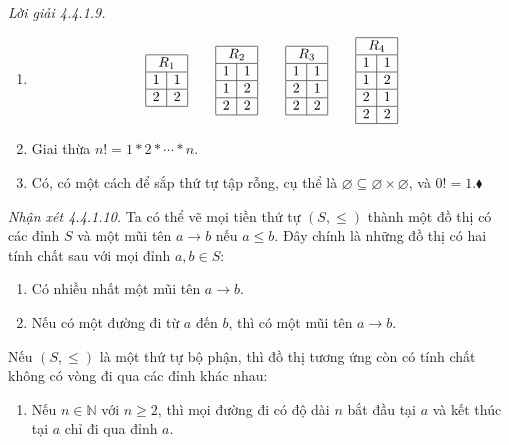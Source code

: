 \noindent\textit{Lời giải 4.4.1.9.}\keepwithnext
\begin{enumerate}[label=\alph*.]
\item
\[
\begin{array}{|r|r|}\hline\multicolumn{2}{|c|}{R_1}\\\hline1&1\\\hline2&2\\\hline\end{array}\qquad
\begin{array}{|r|r|}\hline\multicolumn{2}{|c|}{R_2}\\\hline1&1\\\hline1&2\\\hline2&2\\\hline\end{array}\qquad
\begin{array}{|r|r|}\hline\multicolumn{2}{|c|}{R_3}\\\hline1&1\\\hline2&1\\\hline2&2\\\hline\end{array}\qquad
\begin{array}{|r|r|}\hline\multicolumn{2}{|c|}{R_4}\\\hline1&1\\\hline1&2\\\hline2&1\\\hline2&2\\\hline\end{array}
\]
\item Giai thừa $n!=1*2*\cdots*n$.
\item Có, có một cách để sắp thứ tự tập rỗng, cụ thể là $\varnothing\subseteq\varnothing\times\varnothing$, và $0!=1$.\nobreak\hfill$\blacklozenge$
\end{enumerate}

\noindent\textit{Nhận xét 4.4.1.10.} Ta có thể vẽ mọi tiền thứ tự $(S,\le)$ thành một đồ thị có các đỉnh $S$ và một mũi tên $a\to b$ nếu $a\le b$. Đây chính là những đồ thị có hai tính chất sau với mọi đỉnh $a,b\in S$:
\begin{enumerate}
\item Có nhiều nhất một mũi tên $a\to b$.
\item Nếu có một đường đi từ $a$ đến $b$, thì có một mũi tên $a\to b$.
\end{enumerate}
Nếu $(S,\le)$ là một thứ tự bộ phận, thì đồ thị tương ứng còn có tính chất không có vòng đi qua các đỉnh khác nhau:
\begin{enumerate}[resume]
\item Nếu $n\in\mathbb{N}$ với $n\ge2$, thì mọi đường đi có độ dài $n$ bắt đầu tại $a$ và kết thúc tại $a$ chỉ đi qua đỉnh $a$.
\end{enumerate}

